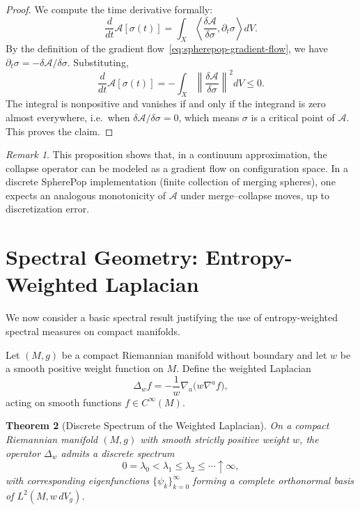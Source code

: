 \documentclass[12pt]{article}
\theoremstyle{plain}
\newtheorem{theorem}{Theorem}[section]
\theoremstyle{definition}
\theoremstyle{remark}
\newtheorem{remark}[theorem]{Remark}
\begin{document}
\begin{proof}
We compute the time derivative formally:
\[
    \frac{d}{dt}\mathcal{A}[\sigma(t)]
    = \int_X \left\langle
        \frac{\delta \mathcal{A}}{\delta \sigma},
        \partial_t \sigma
      \right\rangle dV.
\]
By the definition of the gradient flow~\eqref{eq:spherepop-gradient-flow}, we
have $\partial_t \sigma = - \delta \mathcal{A} / \delta \sigma$. Substituting,
\[
    \frac{d}{dt}\mathcal{A}[\sigma(t)]
    = - \int_X \left\|
        \frac{\delta \mathcal{A}}{\delta \sigma}
      \right\|^2 dV \le 0.
\]
The integral is nonpositive and vanishes if and only if the integrand is zero
almost everywhere, i.e.\ when $\delta \mathcal{A}/\delta \sigma = 0$, which
means $\sigma$ is a critical point of $\mathcal{A}$. This proves the claim.
\end{proof}

\begin{remark}
This proposition shows that, in a continuum approximation, the collapse operator
can be modeled as a gradient flow on configuration space. In a discrete
SpherePop implementation (finite collection of merging spheres), one expects
an analogous monotonicity of $\mathcal{A}$ under merge--collapse moves, up to
discretization error.
\end{remark}


\section{Spectral Geometry: Entropy-Weighted Laplacian}

We now consider a basic spectral result justifying the use of entropy-weighted
spectral measures on compact manifolds.

Let $(M,g)$ be a compact Riemannian manifold without boundary and let $w$ be a
smooth positive weight function on $M$. Define the weighted Laplacian
\[
    \Delta_w f = - \frac{1}{w} \nabla_a\big( w \nabla^a f \big),
\]
acting on smooth functions $f \in C^\infty(M)$.

\begin{theorem}[Discrete Spectrum of the Weighted Laplacian]
\label{thm:weighted-laplacian-spectrum}
On a compact Riemannian manifold $(M,g)$ with smooth strictly positive weight
$w$, the operator $\Delta_w$ admits a discrete spectrum
\[
    0 = \lambda_0 < \lambda_1 \le \lambda_2 \le \cdots \uparrow \infty,
\]
with corresponding eigenfunctions $\{\psi_k\}_{k=0}^\infty$ forming a complete
orthonormal basis of $L^2(M,w\,dV_g)$.
\end{theorem}
\end{document}
